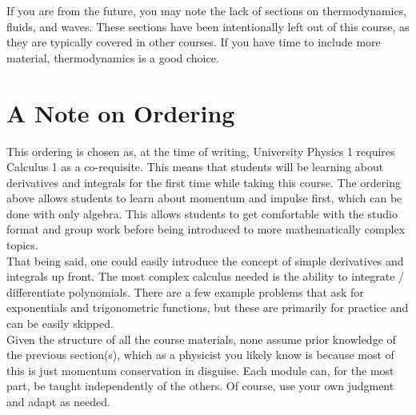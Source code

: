 If you are from the future, you may note the lack of sections on thermodynamics, fluids, and waves.  These sections
have been intentionally left out of this course, as they are typically covered in other courses.  If you have time to 
include more material, thermodynamics is a good choice.

\newpage
\section*{A Note on Ordering}
This ordering is chosen as, at the time of writing, University Physics 1 requires Calculus 1
as a co-requisite.  This means that students will be learning about derivatives and integrals
for the first time while taking this course.  The ordering above allows students to learn
about momentum and impulse first, which can be done with only algebra.  This allows students
to get comfortable with the studio format and group work before being introduced to more
mathematically complex topics. \\

That being said, one could easily introduce the concept of simple derivatives and integrals
up front.  The most complex calculus needed is the ability to integrate / differentiate polynomials. 
There are a few example problems that ask for exponentials and trigonometric functions, but these are 
primarily for practice and can be easily skipped. \\

Given the structure of all the course materials, none assume prior knowledge of the previous section(s),
which as a physicist you likely know is because most of this is just momentum conservation in disguise.
Each module can, for the most part, be taught independently of the others. Of course, use your own judgment and adapt as needed.




